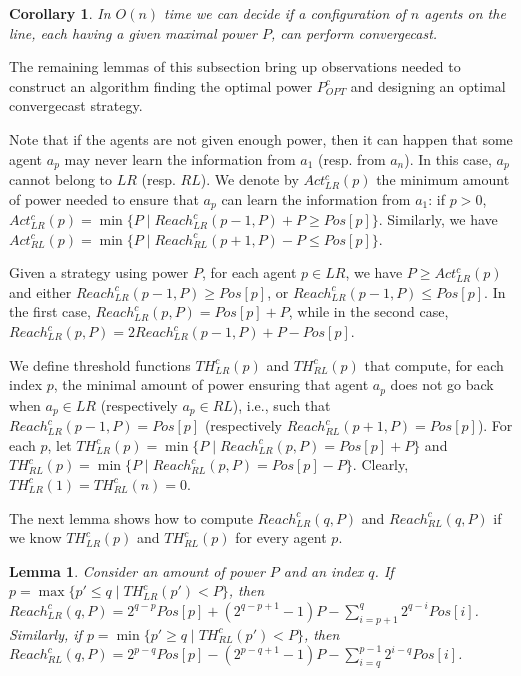 \documentclass{article}
\newtheorem{lemma}{Lemma}
\newtheorem{corollary}{Corollary}
\newcommand\rclr{Reach_{LR}^c\xspace}
\newcommand\rcrl{Reach_{RL}^c\xspace}
\newcommand\acrl{Act_{RL}^c\xspace}
\newcommand\aclr{Act_{LR}^c\xspace}
\newcommand\tclr{TH_{LR}^c\xspace}
\newcommand\tcrl{TH_{RL}^c\xspace}
\newcommand\convergecast{convergecast\xspace}
\begin{document}
\begin{corollary}
In $O(n)$ time we can decide if a configuration of $n$ agents on the
line, each having a given maximal power $P$, can perform
{\convergecast}.
\end{corollary}

The remaining lemmas of this subsection bring up observations needed 
to construct an algorithm finding the optimal power $P_{OPT}^c$ and designing an optimal {\convergecast} strategy.

Note that if the agents are not given enough power, then it can happen
that some agent $a_p$ may never learn the information from $a_1$ (resp.
from $a_n$). In this case, $a_p$ cannot belong to $LR$
(resp. $RL$). We denote by $\aclr(p)$ the minimum amount of power
needed to ensure that $a_p$ can learn the
information from $a_1$: if $p> 0$, $\aclr(p) = \min \{P\mid
\rclr(p-1,P)+P \geq Pos[p]\}$. Similarly, we have $\acrl(p)
= \min \{P \mid \rcrl(p+1,P)-P \leq Pos[p]\}$.

Given a strategy using power $P$, for each agent $p \in LR$, we have
$P \geq \aclr(p)$ and either $\rclr(p-1,P) \geq Pos[p]$, or
$\rclr(p-1,P) \leq Pos[p]$. In the first case, $\rclr(p,P)
= Pos[p]+P$, while in the second case, $\rclr(p,P)=
2\rclr(p-1,P) +P - Pos[p]$. 

We define threshold functions $\tclr(p)$ and $\tcrl(p)$ that compute, for
each index $p$, the minimal amount of power ensuring that agent $a_p$ 
does not go back when $a_p \in LR$
(respectively $a_p \in RL$), i.e., such that $\rclr(p-1,P)=Pos[p]$ (respectively $\rcrl(p+1,P)=Pos[p]$).  
For each $p$, let $\tclr(p) = \min
\{P \mid \rclr(p,P) = Pos[p]+P\}$ and $\tcrl(p) = \min \{P \mid
\rcrl(p,P) = Pos[p]-P\}$. Clearly, $\tclr(1) = \tcrl(n) = 0$.


The next lemma shows how to compute $\rclr(q,P)$ and $\rcrl(q,P)$
if we know $\tclr(p)$ and $\tcrl(p)$ for every agent $p$.

\begin{lemma}\label{lem-eqn-reach}
Consider an amount of power $P$ and an index $q$. If $p = \max \{p'
\leq q \mid \tclr(p') < P\}$, then $\rclr(q,P) = 2^{q-p}Pos[p]
+ (2^{q-p+1}-1)P - \sum_{i=p+1}^{q} 2^{q-i}Pos[i]$. Similarly, if $p =
\min \{p' \geq q \mid \tcrl(p') < P\}$, then $\rcrl(q,P) =
2^{p-q}Pos[p] - (2^{p-q+1}-1)P - \sum_{i=q}^{p-1} 2^{i-q}Pos[i]$.
\end{lemma}
\end{document}
